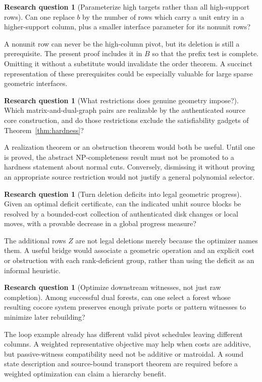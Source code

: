 \documentclass[11pt,letterpaper]{article}
\theoremstyle{definition}
\newtheorem{question}[theorem]{Research question}
\theoremstyle{remark}
\begin{document}
\begin{question}[Parameterize high targets rather than all high-support rows]
Can one replace $b$ by the number of rows which carry a unit entry in a
higher-support column, plus a smaller interface parameter for its nonunit rows?
\end{question}
A nonunit row can never be the high-column pivot, but its deletion is still a
prerequisite. The present proof includes it in $B$ so that the prefix test is
complete. Omitting it without a substitute would invalidate the order theorem.
A succinct representation of these prerequisites could be especially valuable
for large sparse geometric interfaces.

\begin{question}[What restrictions does genuine geometry impose?]
Which matrix-and-dual-graph pairs are realizable by the authenticated source core
construction, and do those restrictions exclude the satisfiability gadgets of
Theorem~\ref{thm:hardness}?
\end{question}
A realization theorem or an obstruction theorem would both be useful. Until
one is proved, the abstract NP-completeness result must not be promoted to a
hardness statement about normal cuts. Conversely, dismissing it without proving
an appropriate source restriction would not justify a general polynomial
selector.

\begin{question}[Turn deletion deficits into legal geometric progress]
Given an optimal deficit certificate, can the indicated unhit source blocks be
resolved by a bounded-cost collection of authenticated disk changes or local
moves, with a provable decrease in a global progress measure?
\end{question}
The additional rows $Z$ are not legal deletions merely because the optimizer
names them. A useful bridge would associate a geometric operation and an explicit
cost or obstruction with each rank-deficient group, rather than using the deficit
as an informal heuristic.

\begin{question}[Optimize downstream witnesses, not just raw completion]
Among successful dual forests, can one select a forest whose resulting cocore
system preserves enough private ports or pattern witnesses to minimize later
rebuilding?
\end{question}
The loop example already has different valid pivot schedules leaving different
columns. A weighted representative objective may help when costs are additive,
but passive-witness compatibility need not be additive or matroidal. A sound
state description and source-bound transport theorem are required before a
weighted optimization can claim a hierarchy benefit.
\end{document}
